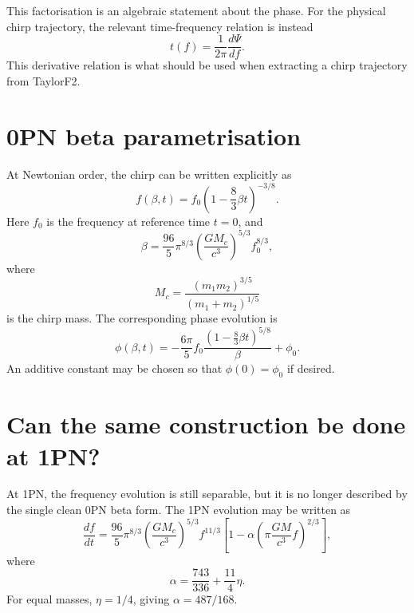 \documentclass[11pt]{article}
\begin{document}
This factorisation is an algebraic statement about the phase. For the physical
chirp trajectory, the relevant time-frequency relation is instead
\begin{equation}
    t(f) = \frac{1}{2\pi}\frac{d\Psi}{df}.
    \label{eq:stationary_phase_time}
\end{equation}
This derivative relation is what should be used when extracting a chirp
trajectory from TaylorF2.

\section{0PN beta parametrisation}

At Newtonian order, the chirp can be written explicitly as
\begin{equation}
    f(\beta,t)
    =
    f_0
    \left(
      1 - \frac{8}{3}\beta t
    \right)^{-3/8}.
    \label{eq:f_0pn_beta}
\end{equation}
Here $f_0$ is the frequency at reference time $t=0$, and
\begin{equation}
    \beta
    =
    \frac{96}{5}
    \pi^{8/3}
    \left(\frac{G M_c}{c^3}\right)^{5/3}
    f_0^{8/3},
    \label{eq:beta_definition}
\end{equation}
where
\begin{equation}
    M_c
    =
    \frac{(m_1m_2)^{3/5}}{(m_1 + m_2)^{1/5}}
\end{equation}
is the chirp mass. The corresponding phase evolution is
\begin{equation}
    \phi(\beta,t)
    =
    -\frac{6\pi}{5}
    f_0
    \frac{
      \left(
        1-\frac{8}{3}\beta t
      \right)^{5/8}
    }{\beta}
    + \phi_0 .
    \label{eq:phi_0pn_beta}
\end{equation}
An additive constant may be chosen so that $\phi(0)=\phi_0$ if desired.

\section{Can the same construction be done at 1PN?}

At 1PN, the frequency evolution is still separable, but it is no longer
described by the single clean 0PN beta form. The 1PN evolution may be written
as
\begin{equation}
    \frac{df}{dt}
    =
    \frac{96}{5}
    \pi^{8/3}
    \left(\frac{G M_c}{c^3}\right)^{5/3}
    f^{11/3}
    \left[
      1
      -
      \alpha
      \left(
        \pi \frac{G M}{c^3} f
      \right)^{2/3}
    \right],
    \label{eq:dfdt_1pn}
\end{equation}
where
\begin{equation}
    \alpha = \frac{743}{336} + \frac{11}{4}\eta .
\end{equation}
For equal masses, $\eta=1/4$, giving $\alpha = 487/168$.
\end{document}
